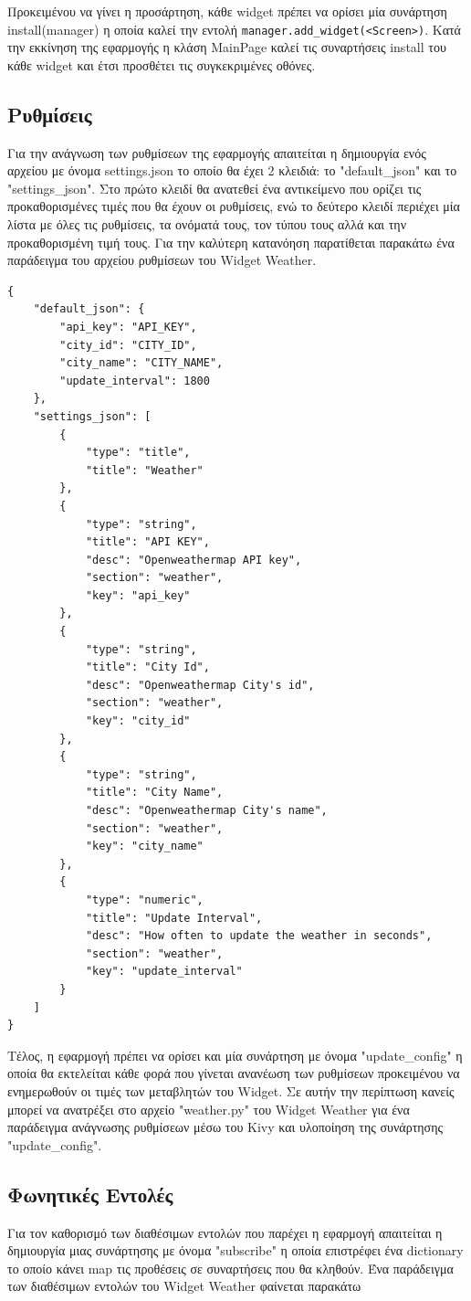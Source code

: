 Προκειμένου να γίνει η προσάρτηση, κάθε widget πρέπει να ορίσει μία συνάρτηση install(manager) η οποία καλεί την εντολή \texttt{manager.add\_widget(<Screen>)}. Κατά την εκκίνηση της εφαρμογής η κλάση MainPage καλεί τις συναρτήσεις install του κάθε widget και έτσι προσθέτει τις συγκεκριμένες οθόνες.

\subsection{Ρυθμίσεις}
Για την ανάγνωση των ρυθμίσεων της εφαρμογής απαιτείται η δημιουργία ενός αρχείου με όνομα settings.json το οποίο θα έχει 2 κλειδιά: το "default\_json" και το "settings\_json". Στο πρώτο κλειδί θα ανατεθεί ένα αντικείμενο που ορίζει τις προκαθορισμένες τιμές που θα έχουν οι ρυθμίσεις, ενώ το δεύτερο κλειδί περιέχει μία λίστα με όλες τις ρυθμίσεις, τα ονόματά τους, τον τύπου τους αλλά και την προκαθορισμένη τιμή τους. Για την καλύτερη κατανόηση παρατίθεται παρακάτω ένα παράδειγμα του αρχείου ρυθμίσεων του Widget Weather. 

\begin{lstlisting}
{
	"default_json": {
		"api_key": "API_KEY",
		"city_id": "CITY_ID",
		"city_name": "CITY_NAME",
		"update_interval": 1800
	},
	"settings_json": [
		{
			"type": "title",
			"title": "Weather"
		},
		{
			"type": "string",
			"title": "API KEY",
			"desc": "Openweathermap API key",
			"section": "weather",
			"key": "api_key"
		},
		{
			"type": "string",
			"title": "City Id",
			"desc": "Openweathermap City's id",
			"section": "weather",
			"key": "city_id"
		},
		{
			"type": "string",
			"title": "City Name",
			"desc": "Openweathermap City's name",
			"section": "weather",
			"key": "city_name"
		},
		{
			"type": "numeric",
			"title": "Update Interval",
			"desc": "How often to update the weather in seconds",
			"section": "weather",
			"key": "update_interval"
		}
	]
}
\end{lstlisting}

Τέλος, η εφαρμογή πρέπει να ορίσει και μία συνάρτηση με όνομα "update\_config" η οποία θα εκτελείται κάθε φορά που γίνεται ανανέωση των ρυθμίσεων προκειμένου να ενημερωθούν οι τιμές των μεταβλητών του Widget. Σε αυτήν την περίπτωση κανείς μπορεί να ανατρέξει στο αρχείο "weather.py" του Widget Weather για ένα παράδειγμα ανάγνωσης ρυθμίσεων μέσω του Kivy και υλοποίηση της συνάρτησης "update\_config".

\subsection{Φωνητικές Εντολές}
Για τον καθορισμό των διαθέσιμων εντολών που παρέχει η εφαρμογή απαιτείται η δημιουργία μιας συνάρτησης με όνομα "subscribe" η οποία επιστρέφει ένα dictionary το οποίο κάνει map τις προθέσεις σε συναρτήσεις που θα κληθούν. Ένα παράδειγμα των διαθέσιμων εντολών του Widget Weather φαίνεται παρακάτω

